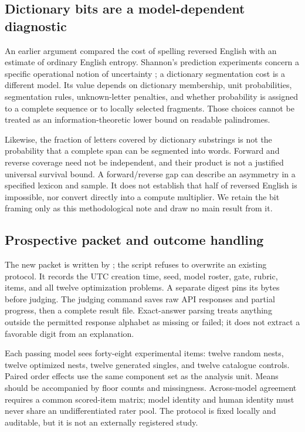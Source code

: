 \documentclass[11pt,letterpaper]{article}
\newcommand{\artifact}[1]{\texttt{\small\detokenize{#1}}}
\begin{document}
\subsection*{Dictionary bits are a model-dependent diagnostic}
An earlier argument compared the cost of spelling reversed English with an estimate of ordinary English entropy. Shannon's prediction experiments concern a specific operational notion of uncertainty \citep{shannon1951entropy}; a dictionary segmentation cost is a different model. Its value depends on dictionary membership, unit probabilities, segmentation rules, unknown-letter penalties, and whether probability is assigned to a complete sequence or to locally selected fragments. Those choices cannot be treated as an information-theoretic lower bound on readable palindromes.

Likewise, the fraction of letters covered by dictionary substrings is not the probability that a complete span can be segmented into words. Forward and reverse coverage need not be independent, and their product is not a justified universal survival bound. A forward/reverse gap can describe an asymmetry in a specified lexicon and sample. It does not establish that half of reversed English is impossible, nor convert directly into a compute multiplier. We retain the bit framing only as this methodological note and draw no main result from it.

\subsection*{Prospective packet and outcome handling}
The new packet is written by \artifact{experiments/revision_seams.py build}; the script refuses to overwrite an existing protocol. It records the UTC creation time, seed, model roster, gate, rubric, items, and all twelve optimization problems. A separate digest pins its bytes before judging. The judging command saves raw API responses and partial progress, then a complete result file. Exact-answer parsing treats anything outside the permitted response alphabet as missing or failed; it does not extract a favorable digit from an explanation.

Each passing model sees forty-eight experimental items: twelve random nests, twelve optimized nests, twelve generated singles, and twelve catalogue controls. Paired order effects use the same component set as the analysis unit. Means should be accompanied by floor counts and missingness. Across-model agreement requires a common scored-item matrix; model identity and human identity must never share an undifferentiated rater pool. The protocol is fixed locally and auditable, but it is not an externally registered study.
\end{document}
